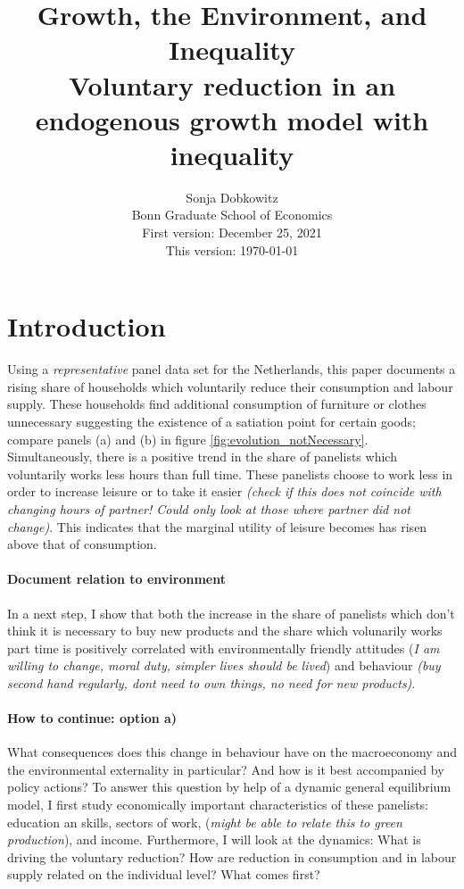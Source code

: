 \documentclass[12pt]{article}
\title{Growth, the Environment, and Inequality\\ \small{ Voluntary reduction in an endogenous growth model with inequality}}
\date{Sonja Dobkowitz\\ Bonn Graduate School of Economics\\ %
	\vspace{1mm}
	First version: December 25, 2021\\
	This version: \today }
\begin{document}
	\maketitle
	
\section{Introduction}
Using a \textit{representative} panel data set for the Netherlands, this paper documents a rising share of households which voluntarily reduce their consumption and labour supply. These households find additional consumption of furniture or clothes unnecessary suggesting the existence of a satiation point for certain goods; compare panels (a) and (b) in figure \ref{fig:evolution_notNecessary}. Simultaneously, there is a positive trend in the share of panelists which voluntarily works less hours than full time. These panelists choose to work less in order to increase leisure or to take it easier \textit{(check if this does not coincide with changing hours of partner! Could only look at those where partner did not change)}. This indicates that the marginal utility of leisure becomes has risen above that of consumption. 

\paragraph{Document relation to environment}
In a next step, I show that both the increase in the share of panelists which don't think it is necessary to buy new products and the share which volunarily works part time is positively correlated with environmentally friendly attitudes (\textit{I am willing to change, moral duty, simpler lives should be lived}) and behaviour \textit{(buy second hand regularly, dont need to own things, no need for new products)}. 

\paragraph{How to continue: option a)}
What consequences does this change in behaviour have on the macroeconomy and the environmental externality in particular? And how is it best accompanied by policy actions?
To answer this question by help of a dynamic general equilibrium model, I first study economically important characteristics of these panelists: education an skills, sectors of work, (\textit{might be able to relate this to green production}), and income. 
Furthermore, I will look at the dynamics: 
What is driving the voluntary reduction? How are reduction in consumption and in labour supply related on the individual level?  What comes first?
\end{document}
